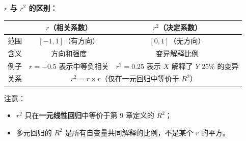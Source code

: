 \medskip
\textbf{$r$ 与 $r^2$ 的区别：}

\begin{center}
\renewcommand{\arraystretch}{1.3}
\begin{tabular}{c|c|c}
\toprule
& \textbf{$r$（相关系数）} & \textbf{$r^2$（决定系数）} \\
\midrule
范围   & $[-1, 1]$（有方向） & $[0, 1]$（无方向） \\
含义   & 方向和强度 & 变异解释比例 \\
例子   & $r = -0.5$ 表示中等负相关 & $r^2 = 0.25$ 表示 $X$ 解释了 $Y$ 25\% 的变异 \\
关系   & \multicolumn{2}{c}{$r^2 = r \times r$（仅在一元回归中等价于 $R^2$）} \\
\bottomrule
\end{tabular}
\end{center}

注意：
\begin{itemize}
    \item $r^2$ 只在\textbf{一元线性回归}中等价于第 9 章定义的 $R^2$；
    \item 多元回归的 $R^2$ 是所有自变量共同解释的比例，不是某个 $r$ 的平方。
\end{itemize}

